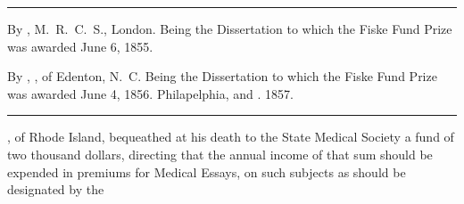 \fancybreak{*}

\footnotesize
{}  By , M.~R.~C.~S., London. Being the Dissertation to which the Fiske Fund Prize was awarded June 6, 1855.

  By , \md, of Edenton, N.~C. Being the Dissertation to which the Fiske Fund Prize was awarded June 4, 1856. Philapelphia,  and . 1857.
\plainbreak{1}

\normalsize

, of Rhode Island, bequeathed at his death to the
State Medical Society a fund of two thousand dollars, directing that
the annual income of that sum should be expended in premiums for
Medical Essays, on such subjects as should be designated by the\endinput
